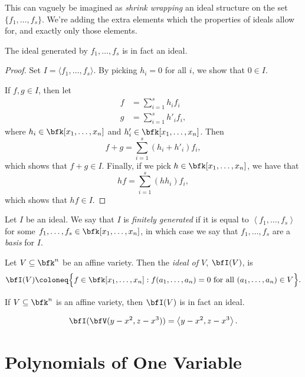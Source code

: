 \documentclass{article}
\newcommand{\gen}[1]{\ensuremath{\left\langle {#1} \right\rangle}}
\begin{document}
This can vaguely be imagined as \textit{shrink wrapping} an ideal structure on the set $\{f_1,\ldots,f_s\}$.
We're adding the extra elements which the properties of ideals allow for, and exactly only those elements.

\begin{lemma}
    The ideal generated by $f_1,\ldots,f_s$ is in fact an ideal.
\end{lemma}
\begin{proof}
    Set $I = \langle f_1,\ldots,f_s \rangle$.
    By picking $h_i = 0$ for all $i$, we show that $0 \in I$.

    If $f,g \in I$, then let
    \begin{align*}
        f &= \sum_{i=1}^s h_i f_i \\
        g &= \sum_{i=1}^s h'_i f_i,
    \end{align*}
    where $h_i \in \bfk[x_1,\ldots,x_n]$ and $h'_i \in \bfk[x_1,\ldots,x_n]$.
    Then 
    \[
        f+g = \sum_{i=1}^s (h_i+h'_i)f_i,
    \]
    which shows that $f+g \in I$.
    Finally, if we pick $h \in \bfk[x_1,\ldots,x_n]$, we have that
    \[
        hf = \sum_{i=1}^s (hh_i)f_i,
    \]
    which shows that $hf \in I$.
\end{proof}

\begin{definition}
    Let $I$ be an ideal.
    We say that $I$ is \textit{finitely generated} if it is equal to $\gen{f_1,\ldots,f_s}$ for some $f_1,\ldots,f_s \in \bfk[x_1,\ldots,x_n]$, in which case we say that $f_1,\ldots,f_s$ are a \textit{basis} for $I$.
\end{definition}


\begin{definition}
    Let $V \subseteq \bfk^n$ be an affine variety.
    Then the \textit{ideal of $V$}, $\bfI(V)$, is
    \[
        \bfI(V) \coloneq \Big\{f \in \bfk[x_1,\ldots,x_n]: f(a_1,\ldots,a_n) = 0 \text{ for all } (a_1,\ldots,a_n) \in V\Big\}.
    \]
\end{definition}

\begin{lemma}
    If $V \subseteq \bfk^n$ is an affine variety, then $\bfI(V)$ is in fact an ideal.
\end{lemma}

\begin{theorem}
    \[
        \bfI(\bfV(y-x^2,z-x^3)) = \gen{y-x^2,z-x^3}.
    \]
\end{theorem}

\section{Polynomials of One Variable}
\end{document}

